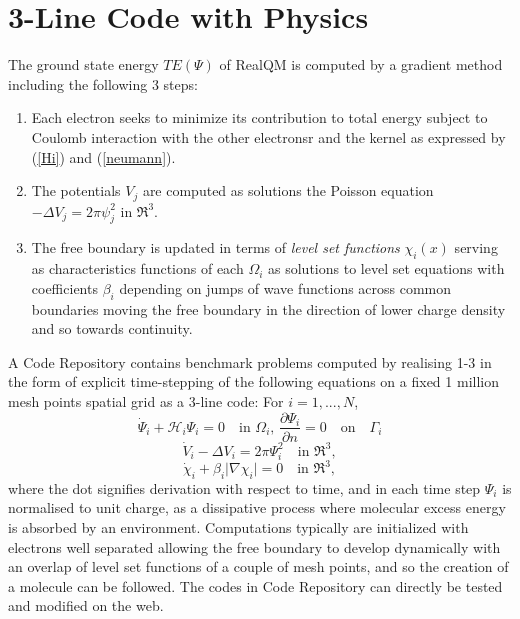 \documentclass[11pt]{article} %
\begin{document}

\section{3-Line Code with Physics}

The ground state energy $TE(\Psi )$ of RealQM is computed by a gradient method including the following 3 steps: 
\begin{enumerate}
\item Each electron seeks to minimize its contribution to total energy subject to Coulomb interaction with the other electronsr
 and the kernel as expressed by (\ref{Hi}) and (\ref{neumann}).
\item The potentials $V_j$ are computed as solutions the Poisson equation $-\Delta V_j=2\pi\psi_j^2$ in $\Re^3$. 
\item The free boundary is updated in terms of \emph{level set functions} $\chi_i (x)$ serving as characteristics functions of each $\Omega_i$ as solutions to level set equations with coefficients $\beta_i$ depending on jumps of wave functions across common boundaries moving the free boundary in the direction of lower charge density and so towards continuity. 
\end{enumerate}
A Code Repository \cite{coderepository} contains benchmark problems computed by realising 1-3 in the form of explicit time-stepping of the following equations on a fixed 1 million mesh points spatial grid as a 3-line code: For  $i=1,...,N$,
\begin{equation}\label{code1}
\dot \Psi_i + \mathcal{H}_i\Psi_i=0\quad\mbox{in }\Omega_i,\, \frac{\partial\Psi_i}{\partial n}=0\quad\mbox{on}\quad\Gamma_i
\end{equation} 
\begin{equation}\label{code2}
\dot V_i -\Delta V_i=2\pi\Psi_i^2\quad\mbox{in }\Re^3,
\end{equation} 
\begin{equation}\label{code3}
\dot\chi_i +\beta_i\vert\nabla\chi_i\vert=0\quad\mbox{in }\Re^3,
\end{equation} 
where the dot signifies derivation with respect to time,  and in each time step $\Psi_i$ is normalised to unit charge,  as a dissipative process where molecular excess energy is absorbed by an environment.
Computations typically are initialized with electrons well separated allowing the free boundary to develop dynamically with an overlap of level set functions of a couple of mesh points,  and so the creation of a molecule can be followed.  The codes in Code Repository can directly be tested and modified on the web.  
\end{document}
